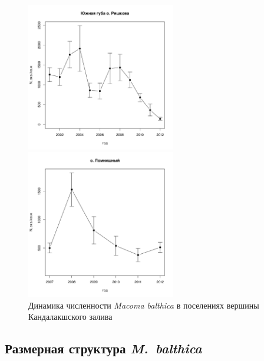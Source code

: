 \documentclass[12pt, a4paper]{article}
\begin{document}
\begin{figure}[h]
\begin{minipage}[b]{.46\linewidth}
\begin{center}
\includegraphics[width=65mm]{../White_Sea/Ryashkov_YuG/N2_dynamic.pdf}
\end{center}
\end{minipage}
%
\hfil %
%
\begin{minipage}[b]{.46\linewidth}
\begin{center}
\includegraphics[width=65mm]{../White_Sea/Lomnishniy/N2_dynamic.pdf}
\end{center}
\end{minipage}



\caption{Динамика численности {\it Macoma balthica} в поселениях вершины Кандалакшского залива}
\label{ris:dynamic_Kandalaksha_all2}
\end{figure}


		\subsection{Размерная структура {\it M.~balthica}}
\end{document}

